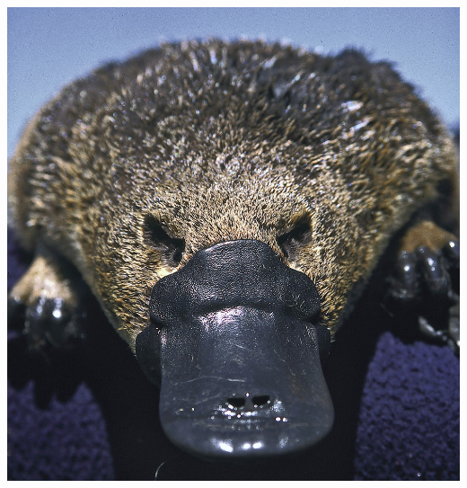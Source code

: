 \begin{frame}
\begin{columns}
\begin{column}{0.5\textwidth}
        \includegraphics[width=\linewidth]{figures/Ornithorhynchus.jpg}
    \end{column}
    \end{columns}
\end{frame}

